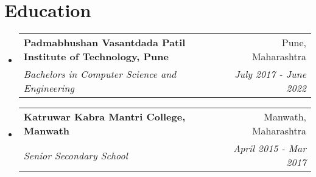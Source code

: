 \documentclass[letterpaper,11pt]{article}
\makeatletter
\newcommand{\resumeSubheading}[4]{
  \vspace{-2pt}\item
    \begin{tabular*}{0.97\textwidth}[t]{l@{\extracolsep{\fill}}r}
      \textbf{#1} & #2 \\
      \textit{\small#3} & \textit{\small #4} \\
    \end{tabular*}\vspace{-7pt}
}
\newcommand{\resumeSubHeadingListStart}{\begin{itemize}[leftmargin=0.15in, label={}]}
\newcommand{\resumeSubHeadingListEnd}{\end{itemize}}
\makeatother
\begin{document}
\section{Education}
  \resumeSubHeadingListStart
    \resumeSubheading
      {Padmabhushan Vasantdada Patil Institute of Technology, Pune}{Pune, Maharashtra}
      {Bachelors in Computer Science and Engineering}{July 2017 - June 2022}
      \resumeSubheading
      {Katruwar Kabra Mantri College, Manwath}{Manwath, Maharashtra}
      {Senior Secondary School}{April 2015 - Mar 2017}
    
  \resumeSubHeadingListEnd

%
\end{document}

